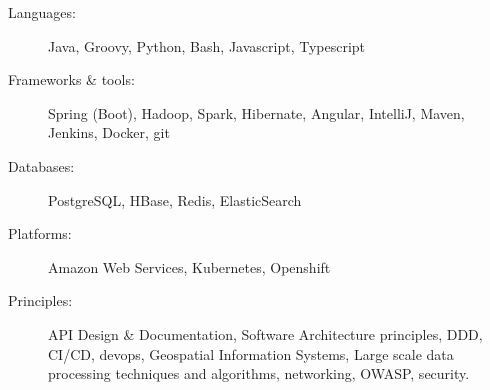 \documentclass[letterpaper,11pt]{article}
\begin{document}
\begin{description}
	\item[Languages:]
	Java, Groovy, Python, Bash, Javascript, Typescript
	\item[Frameworks \& tools:]
	Spring (Boot), Hadoop, Spark, Hibernate, Angular, IntelliJ, Maven, Jenkins, Docker, git
	\item[Databases:]
	PostgreSQL, HBase, Redis, ElasticSearch
	\item[Platforms:]
	Amazon Web Services, Kubernetes, Openshift
	\item[Principles:]
	API Design \& Documentation, Software Architecture principles, DDD, CI/CD, devops, Geospatial Information Systems, Large scale data processing techniques and algorithms, networking, OWASP, security.
\end{description}


\clearpage
\end{document}
